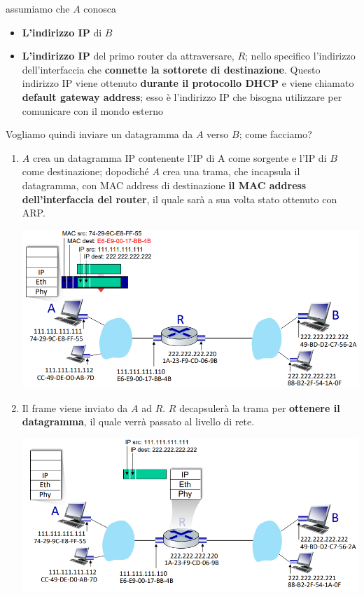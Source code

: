 \documentclass[12pt]{article}
\begin{document}
assumiamo che $A$ conosca
\begin{itemize}
    \item \textbf{L'indirizzo IP} di $B$
    \item \textbf{L'indirizzo IP} del primo router da attraversare, $R$; nello specifico l'indirizzo dell'interfaccia che \textbf{connette la sottorete di destinazione}.
    Questo indirizzo IP viene ottenuto \textbf{durante il protocollo DHCP} e viene chiamato \textbf{default gateway address}; esso è l'indirizzo IP che bisogna utilizzare per comunicare con il mondo esterno
\end{itemize}
Vogliamo quindi inviare un datagramma da $A$ verso $B$; come facciamo?
\begin{enumerate}
    \item $A$ crea un datagramma IP contenente l'IP di A come sorgente e l'IP di $B$ come destinazione; dopodiché $A$ crea una trama, che incapsula il datagramma, con MAC address di destinazione \textbf{il MAC address dell'interfaccia del router}, il quale sarà a sua volta stato ottenuto con ARP.
    \begin{center}
        \includegraphics[width =1\linewidth]{Images/132.png}
    \end{center}
    \item Il frame viene inviato da $A$ ad $R$. $R$ decapsulerà la trama per \textbf{ottenere il datagramma}, il quale verrà passato al livello di rete.
    \begin{center}
        \includegraphics[width =0.901\linewidth]{Images/133.png}

\end{center}
\end{enumerate}
\end{document}
